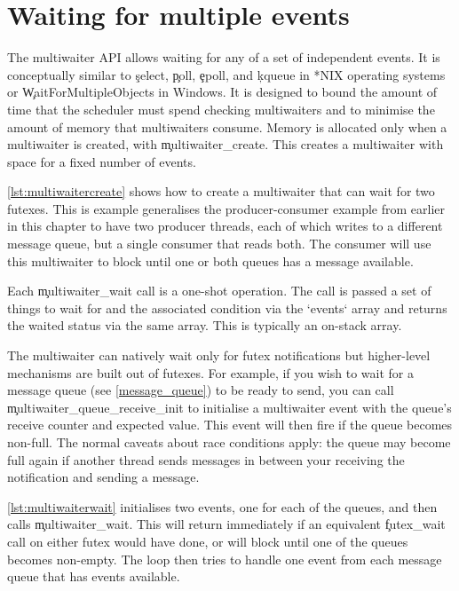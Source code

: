 \section[label=multiwaiter]{Waiting for multiple events}

The multiwaiter API allows waiting for any of a set of independent events.
It is conceptually similar to \c{select}, \c{poll}, \c{epoll}, and \c{kqueue} in *NIX operating systems or \c{WaitForMultipleObjects} in Windows.
It is designed to bound the amount of time that the scheduler must spend checking multiwaiters and to minimise the amount of memory that multiwaiters consume.
Memory is allocated only when a multiwaiter is created, with \c{multiwaiter_create}.
This creates a multiwaiter with space for a fixed number of events.


\ref{lst:multiwaitercreate} shows how to create a multiwaiter that can wait for two futexes.
This is example generalises the producer-consumer example from earlier in this chapter to have two producer threads, each of which writes to a different message queue, but a single consumer that reads both.
The consumer will use this multiwaiter to block until one or both queues has a message available.

\codelisting[filename=examples/multiwaiter/queue.cc,marker=multiwaiter_create,label=lst:multiwaitercreate,caption="Creating a multiwaiter object."]{}

Each \c{multiwaiter_wait} call is a one-shot operation.
The call is passed a set of things to wait for and the associated condition via the `events` array and returns the waited status via the same array.
This is typically an on-stack array.


The multiwaiter can natively wait only for futex notifications but higher-level mechanisms are built out of futexes.
For example, if you wish to wait for a message queue (see \ref{message_queue}) to be ready to send, you can call \c{multiwaiter_queue_receive_init} to initialise a multiwaiter event with the queue's receive counter and expected value.
This event will then fire if the queue becomes non-full.
The normal caveats about race conditions apply: the queue may become full again if another thread sends messages in between your receiving the notification and sending a message.

\ref{lst:multiwaiterwait} initialises two events, one for each of the queues, and then calls \c{multiwaiter_wait}.
This will return immediately if an equivalent \c{futex_wait} call on either futex would have done, or will block until one of the queues becomes non-empty.
The loop then tries to handle one event from each message queue that has events available.

